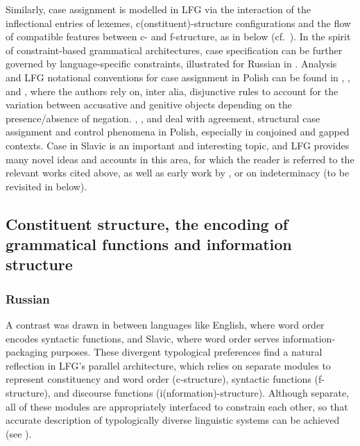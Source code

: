 \documentclass[output=paper,hidelinks]{langscibook}
\begin{document}
Similarly, case assignment is modelled in LFG via the interaction of the inflectional entries of lexemes, c(onstituent)-structure configurations and the flow of compatible features between c- and f-structure, as in  below (cf.\ ).  In the spirit of constraint-based grammatical architectures, case specification can be further governed by language-specific constraints, illustrated for Russian in . Analysis and LFG notational conventions for case assignment in Polish can be found in \citet{Patejuk2015}, \citet{PatejukPrzepiorkowski2014a}, and \citet[337--339]{PatejukPrzepiorkowski2017}, where the authors rely on, inter alia, disjunctive rules to account for the variation between accusative and genitive objects depending on the presence/absence of negation. \citet{prze:99,prze:00aa}, \citet{PrzepiorkowskiPatejuk2011,przepiorkowski-patejuk2012,prz:pat:12b}, \citet{Patejuk2015} and \citet{PatejukPrzepiorkowski2014a,PatejukPrzepiorkowski2017,PatejukPrzepiorkowski2018} deal with agreement, structural case assignment and control phenomena in Polish, especially in conjoined and gapped contexts. Case in Slavic is an important and interesting topic, and LFG provides many novel ideas and accounts in this area, for which the reader is referred to the relevant works cited above, as well as early work by \citet{Neidle1982,Neidle1988}, or \citet{DKS:Indeterminacy} on indeterminacy (to be revisited in  below).

\subsection{Constituent structure, the encoding of grammatical functions and information structure}
\label{sec:Slavic:2.4}

\subsubsection{Russian}
\label{sec:Slavic:2.4.1}

A contrast was drawn in  between languages like English, where word order encodes syntactic functions, and Slavic, where word order serves information-packaging purposes. These divergent typological preferences find a natural reflection in LFG's parallel architecture, which relies on separate modules to represent constituency and word order (c-structure), syntactic functions (f-structure), and discourse functions (i(nformation)-structure). Although separate, all of these modules are appropriately interfaced to constrain each other, so that accurate description of typologically diverse linguistic systems can be achieved (see ). 
\end{document}
